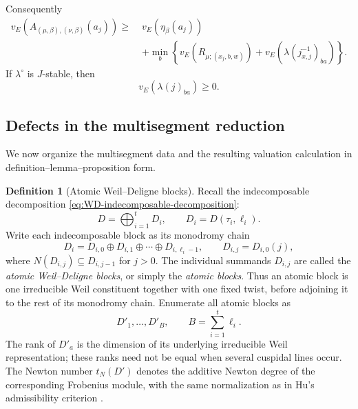 \documentclass[12pt]{article}
\theoremstyle{definition}
\newtheorem{definition}[theorem]{Definition}
\theoremstyle{remark}
\begin{document}
Consequently 
\begin{align}
 v_E
 \left(
 A_{(\mu,\beta),(\nu,\beta)}(a_j)
 \right)
 \geq\;&
 v_E(\eta_\beta(a_j))
 \nonumber\\
 &+
 \min_b
 \left\{
 v_E(R_{\mu;(x_j,b,w)})
 +
 v_E(\lambda(j_{x,j}^{-1})_{ba})
 \right\}.
 \label{eq:matrix-coefficient-valuation-basic}
\end{align}
If \(\lambda^\circ\) is \(J\)-stable, then
\[
 v_E(\lambda(j)_{ba})\geq0.
\]

\subsection{Defects in the multisegment reduction}

We now organize the multisegment data and the resulting valuation calculation
in definition--lemma--proposition form.

\begin{definition}[Atomic Weil--Deligne blocks]
\label{def:atomic-WD-blocks}
Recall the indecomposable decomposition
\eqref{eq:WD-indecomposable-decomposition}:
\[
 D=\bigoplus_{i=1}^tD_i,
 \qquad
 D_i=D(\tau_i,\ell_i).
\]
Write each indecomposable block as its monodromy chain
\begin{equation}\label{eq:atomic-WD-chain}
 D_i
 =D_{i,0}\oplus D_{i,1}\oplus\cdots\oplus D_{i,\ell_i-1},
 \qquad
 D_{i,j}=D_{i,0}(j),
\end{equation}
where \(N(D_{i,j})\subseteq D_{i,j-1}\) for \(j>0\).  The individual
summands \(D_{i,j}\) are called the \emph{atomic Weil--Deligne blocks}, or
simply the \emph{atomic blocks}.  Thus an atomic block is one irreducible
Weil constituent together with one fixed twist, before adjoining it to the
rest of its monodromy chain.  Enumerate all atomic blocks as
\[
 D'_1,\ldots,D'_B,
 \qquad
 B=\sum_{i=1}^t\ell_i.
\]
The rank of \(D'_a\) is the dimension of its underlying irreducible Weil
representation; these ranks need not be equal when several cuspidal lines
occur.  The Newton number \(t_N(D')\) denotes the additive Newton degree of
the corresponding Frobenius module, with the same normalization as in Hu's
admissibility criterion \cite{MR2560407}.
\end{definition}
\end{document}
